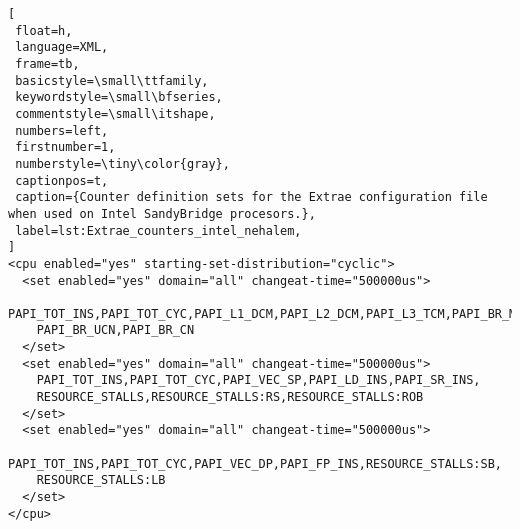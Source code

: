 \begin{lstlisting}[
 float=h,
 language=XML,
 frame=tb,
 basicstyle=\small\ttfamily,
 keywordstyle=\small\bfseries,
 commentstyle=\small\itshape,
 numbers=left,
 firstnumber=1,
 numberstyle=\tiny\color{gray},
 captionpos=t,
 caption={Counter definition sets for the Extrae configuration file when used on Intel SandyBridge procesors.},
 label=lst:Extrae_counters_intel_nehalem,
]
<cpu enabled="yes" starting-set-distribution="cyclic">
  <set enabled="yes" domain="all" changeat-time="500000us">
    PAPI_TOT_INS,PAPI_TOT_CYC,PAPI_L1_DCM,PAPI_L2_DCM,PAPI_L3_TCM,PAPI_BR_MSP,
    PAPI_BR_UCN,PAPI_BR_CN
  </set>
  <set enabled="yes" domain="all" changeat-time="500000us">
    PAPI_TOT_INS,PAPI_TOT_CYC,PAPI_VEC_SP,PAPI_LD_INS,PAPI_SR_INS,
    RESOURCE_STALLS,RESOURCE_STALLS:RS,RESOURCE_STALLS:ROB
  </set>
  <set enabled="yes" domain="all" changeat-time="500000us">
    PAPI_TOT_INS,PAPI_TOT_CYC,PAPI_VEC_DP,PAPI_FP_INS,RESOURCE_STALLS:SB,
    RESOURCE_STALLS:LB
  </set>
</cpu>
\end{lstlisting}
